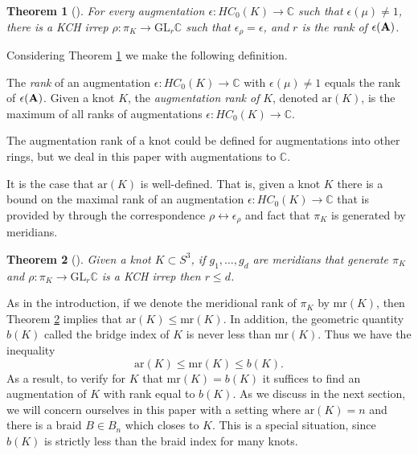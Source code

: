 \documentclass[11pt]{amsart}
\def\C{{\mathbb C}}
\newtheorem{thm}{Theorem}[section]
\newenvironment{definition}[1][Definition]{\begin{trivlist}
\item[\hskip \labelsep {\bfseries #1}]}{\end{trivlist}}
\newenvironment{rem}[1][Remark]{\begin{trivlist}
\item[\hskip \labelsep {\bfseries #1}]}{\end{trivlist}}
\begin{document}
  \begin{thm}[\cite{Cor13b}]
  For every augmentation $\epsilon:HC_0(K)\to\C$ such that $\epsilon(\mu)\ne 1$, there is a KCH irrep $\rho:\pi_K\to\text{GL}_r\C$ such that $\epsilon_\rho=\epsilon$, and $r$ is the rank of $\epsilon({\bf A})$.
  \label{thm:AugKCH_Corresp}
  \end{thm}

  Considering Theorem \ref{thm:AugKCH_Corresp} we make the following definition.

  \begin{definition}
  The \emph{rank} of an augmentation $\epsilon:HC_0(K)\to\C$ with $\epsilon(\mu)\ne 1$ equals the rank of $\epsilon({\bf A})$. Given a knot $K$, the \emph{augmentation rank of } $K$, denoted $\text{ar}(K)$, is the maximum of all ranks of augmentations $\epsilon:HC_0(K)\to\C$.
  \label{defn:AugRk}
  \end{definition}

  \begin{rem} The augmentation rank of a knot could be defined for augmentations into other rings, but we deal in this paper with augmentations to $\C$.
  \end{rem}

  It is the case that $\text{ar}(K)$ is well-defined. That is, given a knot $K$ there is a bound on the maximal rank of an augmentation $\epsilon:HC_0(K)\to\C$ that is provided by through the correspondence $\rho\leftrightarrow\epsilon_\rho$ and fact that $\pi_K$ is generated by meridians.

  \begin{thm}[\cite{Cor13a}] Given a knot $K\subset S^3$, if $g_1,\ldots,g_d$ are meridians that generate $\pi_K$ and $\rho:\pi_K\to\text{GL}_r\C$ is a KCH irrep then $r\le d$.
  \label{thm:DimBound}
  \end{thm}

  As in the introduction, if we denote the meridional rank of $\pi_K$ by $\text{mr}(K)$, then Theorem \ref{thm:DimBound} implies that $\text{ar}(K)\le\text{mr}(K)$. In addition, the geometric quantity $b(K)$ called the bridge index of $K$ is never less than $\text{mr}(K)$. Thus we have the inequality 
    \[\text{ar}(K)\le\text{mr}(K)\le b(K).\]
  As a result, to verify for $K$ that $\text{mr}(K)=b(K)$ it suffices to find an augmentation of $K$ with rank equal to $b(K)$. As we discuss in the next section, we will concern ourselves in this paper with a setting where $\text{ar}(K)=n$ and there is a braid $B\in B_n$ which closes to $K$. This is a special situation, since $b(K)$ is strictly less than the braid index for many knots.
\end{document}
